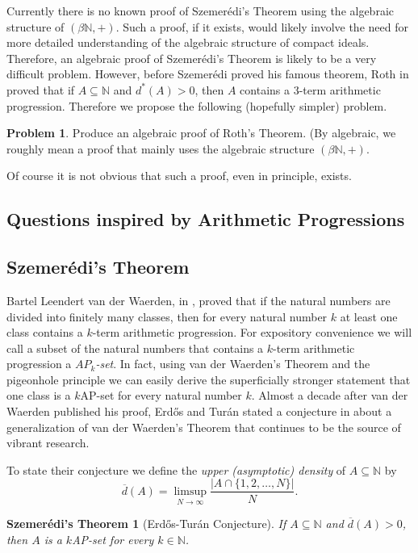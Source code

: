 \documentclass[12pt]{article}
\theoremstyle{plain}
\newtheorem{sz}[thm]{Szemer\'{e}di's Theorem}
\theoremstyle{definition}
\newtheorem{prob}[thm]{Problem}
\newcommand{\bbN}{\mathbb{N}}
\begin{document}
Currently there is no known proof of Szemer\'{e}di's Theorem using the
algebraic structure of $(\beta\bbN, +)$. 
Such a proof, if it exists, would likely involve the need for more
detailed understanding of the algebraic structure of compact ideals. 
Therefore, an algebraic proof of Szemer\'{e}di's Theorem is likely to
be a very difficult problem. 
However, before Szemer\'{e}di proved his famous theorem, Roth in
\cite{Roth:1953fk} proved that if $A \subseteq \bbN$ and $d^*(A) > 0$,
then $A$ contains a 3-term arithmetic progression.
Therefore we propose the following (hopefully simpler) problem.
\begin{prob}
  Produce an algebraic proof of Roth's Theorem. 
  (By algebraic, we roughly mean a proof that mainly uses the
  algebraic structure $(\beta\bbN, +)$. 
\end{prob}

Of course it is not obvious that such a proof, even in principle,
exists.




\subsection{Questions inspired by Arithmetic Progressions} 

\subsection{Szemer\'{e}di's Theorem}
Bartel Leendert van der Waerden, in \cite{Van-der-Waerden:1927fk},
proved that if the natural numbers are divided into finitely many
classes, then for every natural number $k$ at least one class contains
a $k$-term arithmetic progression. 
For expository convenience we will call a subset of the natural
numbers that contains a $k$-term arithmetic progression a
\textsl{$AP_{k}$-set}.
In fact, using van der Waerden's Theorem and the pigeonhole principle
we can easily derive the superficially stronger statement that one
class is a $k$AP-set for every natural number $k$.
Almost a decade after van der Waerden published his proof, Erd\H{o}s
and Tur\'{a}n stated a conjecture in \cite{Erdos:1936fk} about a
generalization of van der Waerden's Theorem that continues to be the
source of vibrant research.

To state their conjecture we define the \textsl{upper (asymptotic)
  density} of $A \subseteq \bbN$ by 
  \[
    \overline{d}(A) = \limsup_{N\to\infty} \frac{|A \cap \{1, 2,
      \ldots, N\}|}{N}.
  \]
  \begin{sz}[Erd\H{o}s-Tur\'{a}n Conjecture]
    \label{sz:upperdensity}
    If $A \subseteq \bbN$ and $\overline{d}(A) > 0$, then $A$ is a
    $k$AP-set for every $k \in \bbN$.
  \end{sz}
\end{document}
